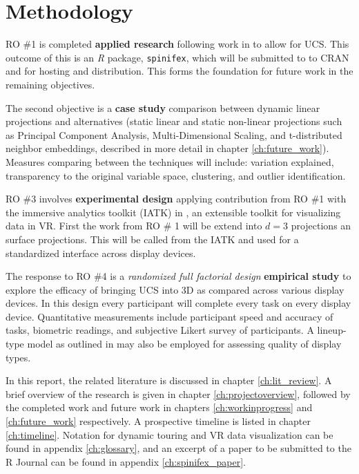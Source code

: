 \documentclass{monashthesis}
\begin{document}
\section{Methodology}\label{methodology}

RO \#1 is completed \textbf{applied research} following work in
\textcite{cook_manual_1997} to allow for UCS. This outcome of this is an
\emph{R} package, \texttt{spinifex}, which will be submitted to to CRAN
and for hosting and distribution. This forms the foundation for future
work in the remaining objectives.

The second objective is a \textbf{case study} comparison between dynamic
linear projections and alternatives (static linear and static non-linear
projections such as Principal Component Analysis, Multi-Dimensional
Scaling, and t-distributed neighbor embeddings, described in more detail
in chapter \ref{ch:future_work}). Measures comparing between the
techniques will include: variation explained, transparency to the
original variable space, clustering, and outlier identification.

RO \#3 involves \textbf{experimental design} applying contribution from
RO \#1 with the immersive analytics toolkit (IATK) in
\textcite{cordeil_immersive_2019}, an extensible toolkit for visualizing
data in VR. First the work from RO \# 1 will be extend into \(d=3\)
projections an surface projections. This will be called from the IATK
and used for a standardized interface across display devices.

The response to RO \#4 is a \emph{randomized full factorial design}
\textbf{empirical study} to explore the efficacy of bringing UCS into 3D
as compared across various display devices. In this design every
participant will complete every task on every display device.
Quantitative measurements include participant speed and accuracy of
tasks, biometric readings, and subjective Likert survey of participants.
A lineup-type model as outlined in \textcite{hofmann_graphical_2012} may
also be employed for assessing quality of display types.

In this report, the related literature is discussed in chapter
\ref{ch:lit_review}. A brief overview of the research is given in
chapter \ref{ch:projectoverview}, followed by the completed work and
future work in chapters \ref{ch:workinprogress} and \ref{ch:future_work}
respectively. A prospective timeline is listed in chapter
\ref{ch:timeline}. Notation for dynamic touring and VR data
visualization can be found in appendix \ref{ch:glossary}, and an excerpt
of a paper to be submitted to the R Journal can be found in appendix
\ref{ch:spinifex_paper}.
\end{document}
